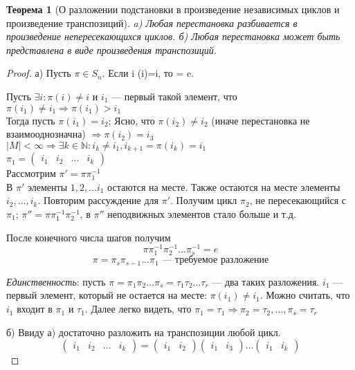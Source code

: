 \documentclass{article}
\theoremstyle{definition}
\theoremstyle{plain}
\newtheorem{theorem}{Теорема}
\begin{document}
\begin{theorem}[О разложении подстановки в произведение независимых циклов и произведение транспозиций]
  a) Любая перестановка разбивается в произведение непересекающихся циклов.
  б) Любая перестановка может быть представлена в виде произведения транспозиций.
\end{theorem}
\begin{proof}
  а) Пусть $\pi \in S_{n}$. Если \forall i \pi(i)=i, то \pi{} = e.

  Пусть $\exists i: \pi(i) \neq i$ и $i_{1}$ --- первый такой элемент, что $\pi(i_{1}) \neq i_{1} \Rightarrow \pi(i_{1}) > i_{1}$\\
  Тогда пусть $\pi(i_{1}) = i_{2}$; Ясно, что $\pi(i_{2}) \neq i_{2}$ (иначе перестановка не взаимооднозначна) $\Rightarrow \pi(i_{2}) = i_{3}$\\
  $|M| < \infty \Rightarrow \exists k \in \mathbb{N}: i_{k} \neq i_{1}, i_{k + 1} = \pi(i_{k}) = i_{1}$\\
  $\pi_{1} = \begin{pmatrix}i_{1}&i_{2}&\ldots&i_{k}\end{pmatrix}$\\
  Рассмотрим $\pi' = \pi \pi_{1}^{-1}$\\
  В $\pi'$ элементы $1, 2, \ldots{} i_{1}$ остаются на месте.
  Также остаются на месте элементы $i_{2}, \ldots, i_{k}$.
  Повторим рассуждение для $\pi'$.
  Получим цикл $\pi_{2}$, не пересекающийся с $\pi_{1}$; $\pi'' = \pi \pi_{1}^{-1} \pi_{2}^{-1}$, в $\pi''$ неподвижных элементов стало больше и т.д.

  После конечного числа шагов получим
  \begin{equation*}
    \pi \pi_{1}^{-1} \pi_{2}^{-1} \ldots \pi_{s}^{-1} = e
  \end{equation*}
  \begin{equation*}
    \pi = \pi_{s}\pi_{s-1} \ldots \pi_{1} \text{ --- требуемое разложение}
  \end{equation*}

  \emph{Единственность}:
  пусть $\pi = \pi_{1} \pi_{2} \ldots \pi_{s} = \tau_{1} \tau_{2} \ldots \tau_{r}$ --- два таких разложения.
  $i_{1}$ --- первый элемент, который не остается на месте: $\pi(i_{1}) \neq i_{1}$.
  Можно считать, что $i_{1}$ входит в $\pi_{1}$ и $\tau_{1}$.
  Далее легко видеть, что $\pi_{1} = \tau_{1} \Rightarrow \pi_{2} = \tau_{2}, \ldots, \pi_{s} = \tau_{r}$

  б) Ввиду а) достаточно разложить на транспозиции любой цикл.
  \begin{equation*}
    \begin{pmatrix}
      i_{1}&i_{2}&\ldots&i_{k}
    \end{pmatrix}
    =
    \begin{pmatrix}
      i_{1}&i_{2}
    \end{pmatrix}
    \begin{pmatrix}
      i_{1}&i_{3}
    \end{pmatrix}
    \ldots
    \begin{pmatrix}
      i_{1}&i_{k}
    \end{pmatrix}
  \end{equation*}
\end{proof}
\end{document}
